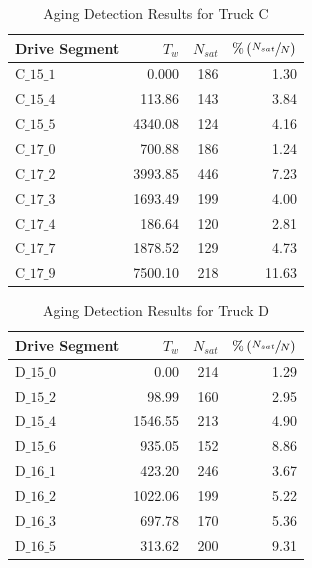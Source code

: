\documentclass[subscriptcorrection,upint,varvw,barcolor=Goldenrod3,mathalfa=cal=euler,balance,hyphenate,french,pdf-a]{asmejour}
\newcommand{\lr}[1]{\left( #1 \right)}
\begin{document}
\begin{table}[H]
        \centering
        \caption{Aging Detection Results for Truck C}
        \label{tab::wer_aging_res}
        \begin{tabular}{l r r r}
                \hline \hline
                Drive Segment & $T_w$   & $N_{sat}$ & $\% \lr{ \sfrac{N_{sat}}{N} }$ \\ \hline \hline
                C$\_15\_1$    & 0.000   & 186       & 1.30                           \\
                C$\_15\_4$    & 113.86  & 143       & 3.84                           \\
                C$\_15\_5$    & 4340.08 & 124       & 4.16                           \\ \hline
                C$\_17\_0$    & 700.88  & 186       & 1.24                           \\
                C$\_17\_2$    & 3993.85 & 446       & 7.23                           \\
                C$\_17\_3$    & 1693.49 & 199       & 4.00                           \\
                C$\_17\_4$    & 186.64  & 120       & 2.81                           \\
                C$\_17\_7$    & 1878.52 & 129       & 4.73                           \\
                C$\_17\_9$    & 7500.10 & 218       & 11.63                          \\
                \hline \hline
        \end{tabular}
\end{table}
\begin{table}[H]
        \centering
        \caption{Aging Detection Results for Truck D}
        \label{tab::trw_aging_res}
        \begin{tabular}{l r r r}
                \hline \hline
                Drive Segment & $T_w$   & $N_{sat}$ & $\% \lr{ \sfrac{N_{sat}}{N} }$ \\ \hline \hline
                D$\_15\_0$    & 0.00    & 214       & 1.29                           \\
                D$\_15\_2$    & 98.99   & 160       & 2.95                           \\
                D$\_15\_4$    & 1546.55 & 213       & 4.90                           \\
                D$\_15\_6$    & 935.05  & 152       & 8.86                           \\ \hline
                D$\_16\_1$    & 423.20  & 246       & 3.67                           \\
                D$\_16\_2$    & 1022.06 & 199       & 5.22                           \\
                D$\_16\_3$    & 697.78  & 170       & 5.36                           \\
                D$\_16\_5$    & 313.62  & 200       & 9.31                           \\
                \hline \hline
        \end{tabular}
\end{table}


\end{document}
